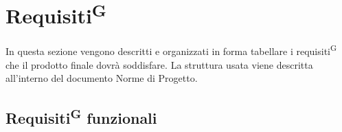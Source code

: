 

\section{Requisiti\textsuperscript{G}}
In questa sezione vengono descritti e organizzati in forma tabellare i requisiti\textsuperscript{G} che il prodotto finale dovrà soddisfare. La struttura usata viene descritta all'interno del documento Norme di Progetto.


\subsection{Requisiti\textsuperscript{G} funzionali}
